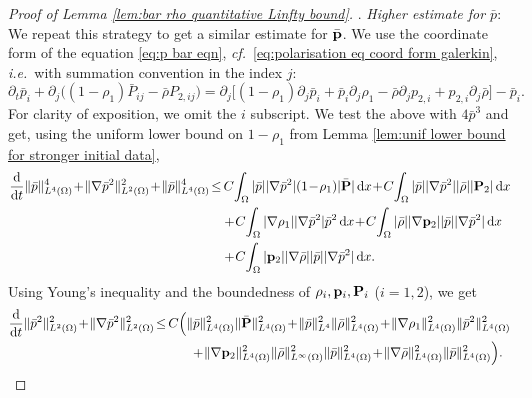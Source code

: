 \documentclass[11pt,a4paper,reqno]{amsart}
\theoremstyle{remark}
\theoremstyle{definition}
\numberwithin{equation}{section}
\renewcommand{\P}{{\bf P}}
\newcommand{\p}{{\bf p}}
\renewcommand{\d}{\, \mathrm{d} }
\newcommand{\der}{\mathrm{d}}
\begin{document}
\begin{proof}[Proof of Lemma \ref{lem:bar rho quantitative Linfty bound}]
\smallskip 

. \textit{Higher estimate for $\bar{p}$}: We repeat this strategy to get a similar estimate for $\bar{\p}$. We use the coordinate form of the equation \eqref{eq:p bar eqn}, \textit{cf.}~\eqref{eq:polarisation eq coord form galerkin}, \textit{i.e.}~with summation convention in the index $j$: 
\begin{equation*}
    \partial_t \bar{p}_i + \partial_j \big( (1\!-\!\rho_1)\bar{P}_{ij} - \bar{\rho} P_{2,ij} \big) = \partial_j \big[ (1\!-\!\rho_1) \partial_j \bar{p}_i + \bar{p}_i \partial_j \rho_1 - \bar{\rho} \partial_j p_{2,i} + p_{2,i}\partial_j \bar{\rho}   \big] - \bar{p}_i. 
\end{equation*}
For clarity  of exposition, we omit the $i$ subscript. We test the above with $4\bar{p}^3$ and get, using the uniform lower bound on $1\!-\!\rho_1$ from Lemma \ref{lem:unif lower bound for stronger initial data}, 
\begin{equation*}
    \begin{aligned}
        \frac{\der}{\der t}\Vert \bar{p}\Vert^4_{L^4(\Omega)} \!+\! \Vert \nabla \bar{p}^2 \Vert^2_{L^2(\Omega)} \!+\! \Vert \bar{p} \Vert^4_{L^4(\Omega)} \!\leq & \, C\! \int_\Omega |\bar{p}| |\nabla \bar{p}^2 | (1\!-\!\rho_1) |\bar{\P}|   \d x \!+\!  C \!\int_\Omega |\bar{p}| |\nabla \bar{p}^2 | |\bar{\rho}| |\P_2| \d x  \\ 
        &+\! C\! \int_\Omega |\nabla \rho_1 | |\nabla \bar{p}^2 | \bar{p}^2 \d x \!+\! C \! \int_\Omega |\bar{\rho}| |\nabla \p_2 | |\bar{p} | |\nabla \bar{p}^2 | \d x \\ 
        &+\! C \!\int_\Omega |\p_2| |\nabla \bar{\rho} | |\bar{p} | |\nabla \bar{p}^2 | \d x. 
    \end{aligned}
\end{equation*}
Using Young's inequality and the boundedness of $\rho_i,\p_i,\P_i$ ($i=1,2$), we get 
\begin{equation*}
    \begin{aligned}
        \frac{\der}{\der t}\Vert \bar{p}^2\Vert^2_{L^2(\Omega)} \!+\! \Vert \nabla \bar{p}^2 \Vert^2_{L^2(\Omega)}  \!\leq & \, C \Big( \Vert \bar{p} \Vert^2_{L^4(\Omega)} \Vert \bar{\P} \Vert^2_{L^4(\Omega)} \! +\!  \Vert \bar{p} \Vert_{L^4}^2 \Vert \bar{\rho}\Vert^2_{L^4(\Omega)} \! + \! \Vert \nabla \rho_1 \Vert^2_{L^{4}(\Omega)} \Vert \bar{p}^2 \Vert_{L^4(\Omega)}^2  \\ 
        &\,\,\,\,\,\,\,\,\,\,\, +\! \Vert \nabla \p_2 \Vert^2_{L^4(\Omega)} \Vert \bar{\rho} \Vert^2_{L^\infty(\Omega)} \Vert \bar{p} \Vert^2_{L^{4}(\Omega)} \!+\! \Vert \nabla \bar{\rho} \Vert^2_{L^4(\Omega)} \Vert \bar{p} \Vert^2_{L^4(\Omega)} \Big). 

\end{aligned}
\end{equation*}
\end{proof}
\end{document}
